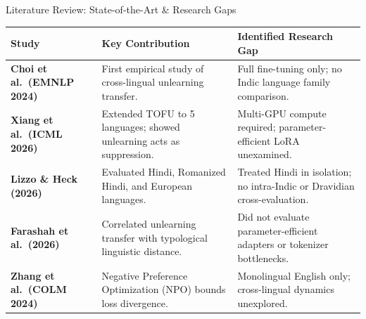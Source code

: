 \documentclass[aspectratio=169,10pt]{beamer}
\begin{document}
\begin{frame}{Literature Review: State-of-the-Art \& Research Gaps}
  \small
  \begin{table}[H]
    \centering\scriptsize
    \begin{tabularx}{\textwidth}{lXX}
      \toprule
      \textbf{Study} & \textbf{Key Contribution} & \textbf{Identified Research Gap} \\
      \midrule
      \textbf{Choi et al.\ (EMNLP 2024)} & First empirical study of cross-lingual unlearning transfer. & Full fine-tuning only; no Indic language family comparison. \\
      \addlinespace
      \textbf{Xiang et al.\ (ICML 2026)} & Extended TOFU to 5 languages; showed unlearning acts as suppression. & Multi-GPU compute required; parameter-efficient LoRA unexamined. \\
      \addlinespace
      \textbf{Lizzo \& Heck (2026)} & Evaluated Hindi, Romanized Hindi, and European languages. & Treated Hindi in isolation; no intra-Indic or Dravidian cross-evaluation. \\
      \addlinespace
      \textbf{Farashah et al.\ (2026)} & Correlated unlearning transfer with typological linguistic distance. & Did not evaluate parameter-efficient adapters or tokenizer bottlenecks. \\
      \addlinespace
      \textbf{Zhang et al.\ (COLM 2024)} & Negative Preference Optimization (NPO) bounds loss divergence. & Monolingual English only; cross-lingual dynamics unexplored. \\
      \bottomrule
    \end{tabularx}
  \end{table}
\end{frame}
\end{document}
